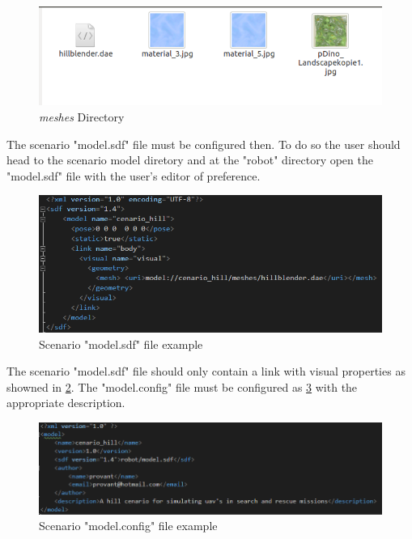 			\begin{figure}[!ht]
	\centering
	\includegraphics[width=350pt]{figuras/mesheshill.png}
	\caption{\textit{meshes} Directory}
	\label{mesheshill}
\end{figure}

The scenario "model.sdf" file must be configured then. To do so the user should head to the scenario model diretory and at the "robot" directory open the "model.sdf" file with the user's editor of preference.  

			\begin{figure}[!ht]
	\centering
	\includegraphics[width=350pt]{figuras/excenario.png}
	\caption{Scenario "model.sdf" file example}
	\label{excenario}
	\end{figure}

The scenario "model.sdf" file should only contain a link with visual properties as showned in \ref{excenario}. The "model.config" file must be configured as \ref{ex2cenario} with the appropriate description.



			\begin{figure}[!ht]
	\centering
	\includegraphics[width=350pt]{figuras/ex2cenario.png}
	\caption{Scenario "model.config" file example}
	\label{ex2cenario}
\end{figure}

